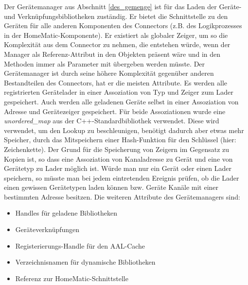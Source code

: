 Der Gerätemanager aus Abschnitt \ref{des_gemenge} ist für das Laden der Geräte- und Verknüpfungsbibliotheken zuständig.
Er bietet die Schnittstelle zu den Geräten für alle anderen Komponenten des Connectors (z.B. des Logikprozesses in
der HomeMatic-Komponente).
Er existiert als globaler Zeiger, um so die Komplexität aus dem Connector zu nehmen, die entstehen würde, wenn der Manager
als Referenz-Attribut in den Objekten präsent wäre und in den Methoden immer als Parameter mit übergeben werden müsste.
Der Gerätemanager ist durch seine höhere Komplexität gegenüber anderen Bestandteilen des Connectors, hat er die meisten
Attribute.
Es werden alle registrierten Gerätelader in einer Assoziation von Typ und Zeiger zum Lader gespeichert.
Auch werden alle geladenen Geräte selbst in einer Assoziation von Adresse und Gerätezeiger gespeichert.
Für beide Assoziationen wurde eine \emph{unordered\_map} aus der C++-Standardbibliothek verwendet.
Diese wird verwendet, um den Lookup zu beschleunigen, benötigt dadurch aber etwas mehr Speicher, durch das Mitspeichern
einer Hash-Funktion für den Schlüssel (hier: Zeichenkette).
Der Grund für die Speicherung von Zeigern im Gegensatz zu Kopien ist, so dass eine Assoziation von Kanaladresse zu Gerät
und eine von Gerätetyp zu Lader möglich ist.
Würde man nur ein Gerät oder einen Lader speichern, so müsste man bei jedem eintretenden Ereignis prüfen, ob die Lader
einen gewissen Gerätetypen laden können bzw. Geräte Kanäle mit einer bestimmten Adresse besitzen.
Die weiteren Attribute des Gerätemanagers sind:
\begin{itemize}
\item Handles für geladene Bibliotheken
\item Geräteverknüpfungen
\item Registerierungs-Handle für den AAL-Cache
\item Verzeichnisnamen für dynamische Bibliotheken
\item Referenz zur HomeMatic-Schnittstelle
\end{itemize}

